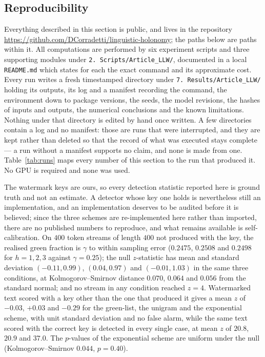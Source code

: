 \documentclass[11pt,a4paper]{article}
\theoremstyle{plain}
\theoremstyle{definition}
\numberwithin{equation}{section}
\begin{document}
\subsection{Reproducibility}\label{sec:repro}

Everything described in this section is public, and lives in the
repository
\url{https://github.com/DCorradetti/linguistic-holonomy}; the paths
below are paths within it. All computations are performed by six
experiment scripts and three supporting modules under
\texttt{2.~Scripts/Article\_LLW/}, documented in a local
\texttt{README.md} which states for each the exact command and its
approximate cost. Every run writes a fresh timestamped
directory under \texttt{7.~Results/Article\_LLW/} holding its outputs,
its log and a manifest recording the command, the environment down to
package versions, the seeds, the model revisions, the hashes of inputs
and outputs, the numerical conclusions and the known limitations.
Nothing under that directory is edited by hand once written. A few
directories contain a log and no manifest: those are runs that were
interrupted, and they are kept rather than deleted so that the record of
what was executed stays complete --- a run without a manifest supports
no claim, and none is made from one. Table~\ref{tab:runs} maps every
number of this section to the run that produced it. No GPU is required
and none was used.

The watermark keys are ours, so every detection statistic reported here
is ground truth and not an estimate. A detector whose key one holds is
nevertheless still an implementation, and an implementation deserves to
be audited before it is believed; since the three schemes are
re-implemented here rather than imported, there are no published numbers
to reproduce, and what remains available is self-calibration. On $400$
token streams of length $400$ not produced with the key, the realised
green fraction is $\gamma$ to within sampling error ($0.2475$, $0.2508$
and $0.2498$ for $h = 1,2,3$ against $\gamma = 0.25$); the null
$z$-statistic has mean and standard deviation $(-0.11, 0.99)$,
$(0.04, 0.97)$ and $(-0.01, 1.03)$ in the same three conditions, at
Kolmogorov--Smirnov distance $0.070$, $0.064$ and $0.056$ from the
standard normal; and no stream in any condition reached $z = 4$.
Watermarked text scored with a key other than the one that produced it
gives a mean $z$ of $-0.03$, $+0.03$ and $-0.29$ for the green-list, the
unigram and the exponential scheme, with unit standard deviation and no
false alarm, while the same text scored with the correct key is detected
in every single case, at mean $z$ of $20.8$, $20.9$ and $37.0$. The
$p$-values of the exponential scheme are uniform under the null
(Kolmogorov--Smirnov $0.044$, $p = 0.40$).
\end{document}
